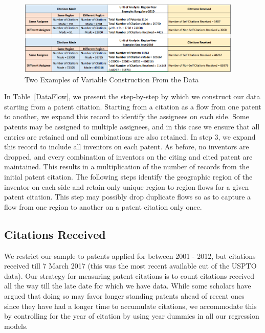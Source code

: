 \documentclass[12pt,letterpaper]{article}
\begin{document}
\begin{figure}[h!]
\begin{centering}
  \captionsetup{labelsep=newline}
  \caption{\newline Two Examples of Variable Construction From the Data}
  \label{FlowsBreakup}
  \includegraphics[width=0.95\textwidth]{FlowsBreakup2}
\end{centering}
\end{figure}

In Table~\ref{DataFlow}, we present the step-by-step by which we construct our data starting from a patent citation. Starting from a citation as a flow from one patent to another, we expand this record to identify the assignees on each side. Some patents may be assigned to multiple assignees, and in this case we ensure that all entries are retained and all combinations are also retained. In step 3, we expand this record to include all inventors on each patent. As before, no inventors are dropped, and every combination of inventors on the citing and cited patent are maintained. This results in a multiplication of the number of records from the initial patent citation. The following steps identify the geographic region of the inventor on each side and retain only unique region to region flows for a given patent citation. This step may possibly drop duplicate flows so as to capture a flow from one region to another on a patent citation only once.



\subsection{Citations Received}
We restrict our sample to patents applied for between 2001 - 2012, but citations received till 7 March 2017 (this was the most recent available cut of the USPTO data). Our strategy for measuring patent citations is to count citations received all the way till the late date for which we have data. While some scholars have argued that doing so may favor longer standing patents ahead of recent ones since they have had a longer time to accumulate citations, we accommodate this by controlling for the year of citation by using year dummies in all our regression models. \par
\end{document}
